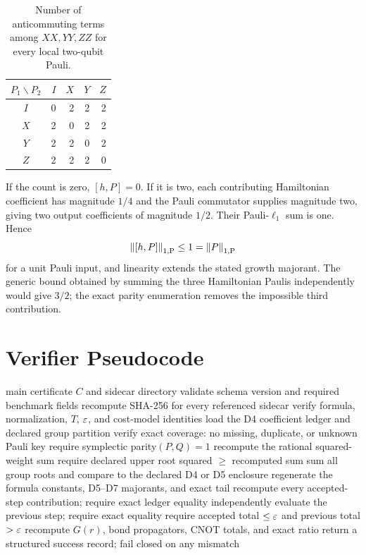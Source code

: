 \begin{table}[ht]
\centering
\caption{Number of anticommuting terms among $XX,YY,ZZ$ for every local
two-qubit Pauli.}
\label{tab:local-audit}
\begin{tabular}{@{}c|rrrr@{}}
\toprule
$P_1\backslash P_2$ & $I$ & $X$ & $Y$ & $Z$ \\
\midrule
$I$ & 0 & 2 & 2 & 2 \\
$X$ & 2 & 0 & 2 & 2 \\
$Y$ & 2 & 2 & 0 & 2 \\
$Z$ & 2 & 2 & 2 & 0 \\
\bottomrule
\end{tabular}
\end{table}

If the count is zero, $[h,P]=0$.  If it is two, each contributing Hamiltonian
coefficient has magnitude $1/4$ and the Pauli commutator supplies magnitude
two, giving two output coefficients of magnitude $1/2$.  Their
Pauli-$\ell_1$ sum is one.  Hence
\begin{equation}
  \left\lVert [h,P]\right\rVert_{1,\mathrm{P}}\leq1=\left\lVert P\right\rVert_{1,\mathrm{P}}
\end{equation}
for a unit Pauli input, and linearity extends the stated growth majorant.  The
generic bound obtained by summing the three Hamiltonian Paulis independently
would give $3/2$; the exact parity enumeration removes the impossible third
contribution.

\section{Verifier Pseudocode}
\label{app:verifier}

\begin{algorithm}[ht]
\caption{Independent verification of the principal certificate}
\label{alg:verifier}
\begin{algorithmic}[1]
\Require main certificate $C$ and sidecar directory
\State validate schema version and required benchmark fields
\State recompute SHA-256 for every referenced sidecar
\State verify formula, normalization, $T$, $\varepsilon$, and cost-model identities
\State load the D4 coefficient ledger and declared group partition
\State verify exact coverage: no missing, duplicate, or unknown Pauli key
    \State require symplectic parity$(P,Q)=1$
  \EndFor
  \State recompute the rational squared-weight sum
  \State require declared upper root squared $\geq$ recomputed sum
\EndFor
\State sum all group roots and compare to the declared D4 or D5 enclosure
\State regenerate the formula constants, D5--D7 majorants, and exact tail
\State recompute every accepted-step contribution; require exact ledger equality
\State independently evaluate the previous step; require exact equality
\State require accepted total $\leq\varepsilon$ and previous total $>\varepsilon$
\State recompute $G(r)$, bond propagators, CNOT totals, and exact ratio
\State return a structured success record; fail closed on any mismatch
\end{algorithmic}
\end{algorithm}


